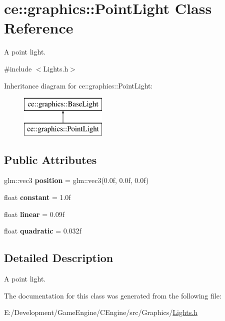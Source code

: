 \hypertarget{classce_1_1graphics_1_1_point_light}{}\section{ce\+:\+:graphics\+:\+:Point\+Light Class Reference}
\label{classce_1_1graphics_1_1_point_light}


A point light.  




{\ttfamily \#include $<$Lights.\+h$>$}

Inheritance diagram for ce\+:\+:graphics\+:\+:Point\+Light\+:\begin{figure}[H]
\begin{center}
\leavevmode
\includegraphics[height=2.000000cm]{classce_1_1graphics_1_1_point_light}
\end{center}
\end{figure}
\subsection*{Public Attributes}
\begin{DoxyCompactItemize}
\item 
\mbox{\label{classce_1_1graphics_1_1_point_light_a243f8f1019644d4a983a76bee93dd0e5}} 
glm\+::vec3 {\bfseries position} = glm\+::vec3(0.\+0f, 0.\+0f, 0.\+0f)
\item 
\mbox{\label{classce_1_1graphics_1_1_point_light_aeaa6b5a0295a24d5ee38857bc27fe971}} 
float {\bfseries constant} = 1.\+0f
\item 
\mbox{\label{classce_1_1graphics_1_1_point_light_a17a135df574a30bc43e0ca56f46361ca}} 
float {\bfseries linear} = 0.\+09f
\item 
\mbox{\label{classce_1_1graphics_1_1_point_light_a4a5db9aa2d038c7392d386614c92ac72}} 
float {\bfseries quadratic} = 0.\+032f
\end{DoxyCompactItemize}


\subsection{Detailed Description}
A point light. 

The documentation for this class was generated from the following file\+:\begin{DoxyCompactItemize}
\item 
E\+:/\+Development/\+Game\+Engine/\+C\+Engine/src/\+Graphics/\hyperlink{_lights_8h}{Lights.\+h}\end{DoxyCompactItemize}
